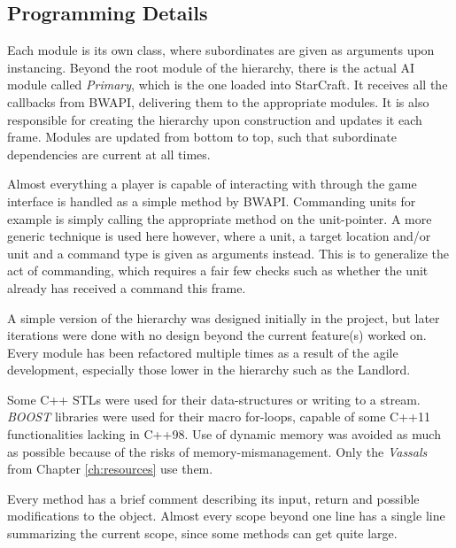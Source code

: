 	\subsection*{Programming Details}
	Each module is its own class, where subordinates are given as arguments upon instancing. Beyond the root module of the hierarchy, there is the actual AI module called \emph{Primary}, which is the one loaded into StarCraft. It receives all the callbacks from BWAPI, delivering them to the appropriate modules. It is also responsible for creating the hierarchy upon construction and updates it each frame. Modules are updated from bottom to top, such that subordinate dependencies are current at all times.
	
	Almost everything a player is capable of interacting with through the game interface is handled as a simple method by BWAPI. Commanding units for example is simply calling the appropriate method on the unit-pointer. A more generic technique is used here however, where a unit, a target location and/or unit and a command type is given as arguments instead. This is to generalize the act of commanding, which requires a fair few checks such as whether the unit already has received a command this frame.
	
	A simple version of the hierarchy was designed initially in the project, but later iterations were done with no design beyond the current feature(s) worked on. Every module has been refactored multiple times as a result of the agile development, especially those lower in the hierarchy such as the Landlord.
	
	Some C++ STLs were used for their data-structures or writing to a stream. \emph{BOOST} libraries were used for their macro for-loops, capable of some C++11 functionalities lacking in C++98. Use of dynamic memory was avoided as much as possible because of the risks of memory-mismanagement. Only the \emph{Vassals} from Chapter \ref{ch:resources} use them.
	
	Every method has a brief comment describing its input, return and possible modifications to the object. Almost every scope beyond one line has a single line summarizing the current scope, since some methods can get quite large.